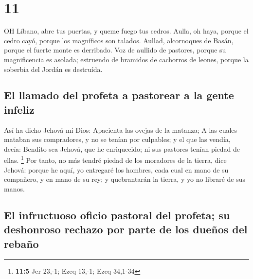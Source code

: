 \hypertarget{section-10}{%
\section{11}\label{section-10}}

 OH Líbano, abre tus puertas, y queme fuego tus cedros.
 Aulla, oh haya, porque el cedro cayó, porque los magníficos
son talados. Aullad, alcornoques de Basán, porque el fuerte monte es
derribado.  Voz de aullido de pastores, porque su
magnificencia es asolada; estruendo de bramidos de cachorros de leones,
porque la soberbia del Jordán es destruída.

\hypertarget{el-llamado-del-profeta-a-pastorear-a-la-gente-infeliz}{%
\subsection{El llamado del profeta a pastorear a la gente
infeliz}\label{el-llamado-del-profeta-a-pastorear-a-la-gente-infeliz}}

 Así ha dicho Jehová mi Dios: Apacienta las ovejas de la
matanza;  A las cuales mataban sus compradores, y no se
tenían por culpables; y el que las vendía, decía: Bendito sea Jehová,
que he enriquecido; ni sus pastores tenían piedad de ellas. \footnote{\textbf{11:5}
  Jer 23,-1; Ezeq 13,-1; Ezeq 34,1-34}  Por tanto, no más
tendré piedad de los moradores de la tierra, dice Jehová: porque he
aquí, yo entregaré los hombres, cada cual en mano de su compañero, y en
mano de su rey; y quebrantarán la tierra, y yo no libraré de sus manos.

\hypertarget{el-infructuoso-oficio-pastoral-del-profeta-su-deshonroso-rechazo-por-parte-de-los-dueuxf1os-del-rebauxf1o}{%
\subsection{El infructuoso oficio pastoral del profeta; su deshonroso
rechazo por parte de los dueños del
rebaño}\label{el-infructuoso-oficio-pastoral-del-profeta-su-deshonroso-rechazo-por-parte-de-los-dueuxf1os-del-rebauxf1o}}

